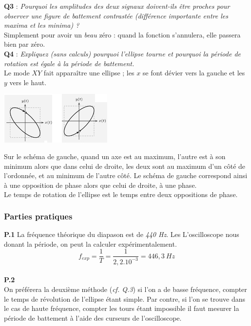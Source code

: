 \documentclass	[11pt, a4paper, openany]{book}
\begin{document}
\textbf{Q3} : \textit{Pourquoi les amplitudes des deux signaux doivent-ils être proches pour observer une figure de battement contrastée (différence importante entre les maxima et les minima) ?}\\
Simplement pour avoir un \textit{beau} zéro : quand la fonction s'annulera, elle passera bien par zéro.\\

\textbf{Q4} : \textit{Expliquez (sans calculs) pourquoi l'ellipse tourne et pourquoi la période de rotation est égale à la période de battement.}\\
Le mode $XY$ fait apparaître une ellipse ; les $x$ se font dévier vers la gauche et les $y$ vers le haut.
\begin{center}
\includegraphics[scale=1]{labo/image2.png}
\end{center}
Sur le schéma de gauche, quand un axe est au maximum, l'autre est à son minimum alors que dans celui de droite, les deux sont au maximum d'un côté de l'ordonnée, et au minimum de l'autre côté. Le schéma de gauche correspond ainsi à une opposition de phase alors que celui de droite, à une phase. \\
Le temps de rotation de l'ellipse est le temps entre deux oppositions de phase.

\subsubsection*{Parties pratiques}
\textbf{P.1} La fréquence théorique du diapason est de \textit{440 Hz}. Les L'oscilloscope nous donant la période, on peut la calculer expérimentalement.
\begin{equation}
f_{exp} = \frac{1}{T} = \frac{1}{2,2 . 10^{-3}} = 446,3\ Hz
\end{equation}
\ \\

\textbf{P.2}\\
On préférera la deuxième méthode (\textit{cf. Q.3})  si l'on a de basse fréquence, compter le temps de révolution de l'ellipse étant simple. Par contre, si l'on se trouve dans le cas de haute fréquence, compter les tours étant impossible il faut mesurer la période de battement à l'aide des curseurs de l'oscilloscope.\\
\end{document}
